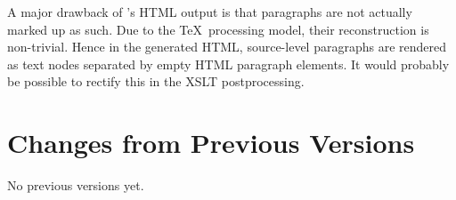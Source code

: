 \documentclass[11pt,a4paper]{ivoa}
\begin{document}
A major drawback of \ivoatex's HTML output is that paragraphs are not actually
marked up as such.  Due to the \TeX\ processing model, their
reconstruction is non-trivial.  Hence in the generated HTML,
source-level paragraphs are rendered as text nodes separated by empty
HTML paragraph elements.  It would probably be possible to rectify this
in the XSLT postprocessing.


\appendix
\section{Changes from Previous Versions}

No previous versions yet.  



\end{document}
